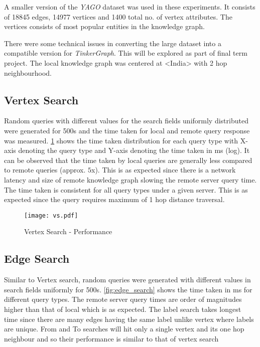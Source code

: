 \documentclass[conference]{IEEEtran}
\begin{document}
A smaller version of the \emph{YAGO}\cite{Suchanek:2007:YCS:1242572.1242667} dataset was used in these experiments. It consists of 18845 edges, 14977 vertices and 1400 total no. of vertex attributes. The vertices consists of most popular entities in the knowledge graph.

There were some technical issues in converting the large dataset into a compatible version for \emph{TinkerGraph}. This will be explored as part of final term project. The local knowledge graph was centered at <India> with 2 hop neighbourhood.

\subsection{Vertex Search}

Random queries with different values for the search fields uniformly distributed were generated for 500s and the time taken for local and remote query response was measured. \ref{fig:vertex_search} shows the time taken distribution for each query type with X-axis denoting the query type and Y-axis denoting the time taken in ms (log). It can be observed that the time taken by local queries are generally less compared to remote queries (approx. $5$x). This is as expected since there is a network latency and size of remote knowledge graph slowing the remote server query time. The time taken is consistent for all query types under a given server. This is as expected since the query requires maximum of 1 hop distance traversal. 

\begin{figure}[!t]
	\centering
	\texttt{[image: vs.pdf]}
	\caption{Vertex Search - Performance}
	\label{fig:vertex_search}
\end{figure} 

\subsection{Edge Search}

Similar to Vertex search, random queries were generated with different values in search fields uniformly for 500s. \ref{fig:edge_search} shows the time taken in ms for different query types. The remote server query times are order of magnitudes higher than that of local which is as expected. The label search takes longest time since there are many edges having the same label unlike vertex where labels are unique. From and To searches will hit only a single vertex and its one hop neighbour and so their performance is similar to that of vertex search
\end{document}
